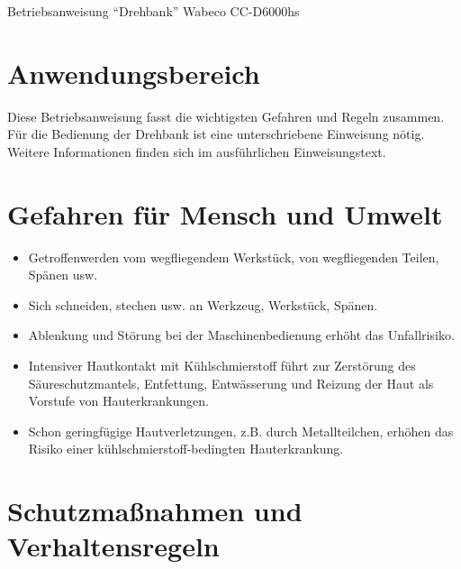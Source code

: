 \documentclass[fontsize=9pt]{scrartcl}
\newenvironment{smallitemize}{\begin{itemize}\itemsep -3pt}{\end{itemize}}
\begin{document}

\begin{center}
	\LARGE{Betriebsanweisung \enquote{Drehbank} Wabeco CC-D6000hs}
\end{center}


\section{Anwendungsbereich}
\begin{center}
	Diese Betriebsanweisung fasst die wichtigsten Gefahren und Regeln zusammen.\\
	Für die Bedienung der Drehbank ist eine unterschriebene Einweisung nötig.\\
	Weitere Informationen finden sich im ausführlichen Einweisungstext.\\
\end{center}

\section{Gefahren für Mensch und Umwelt}

\begin{smallitemize}
	\item Getroffenwerden vom wegfliegendem Werkstück, von wegfliegenden Teilen, Spänen usw.
	\item Sich schneiden, stechen usw. an Werkzeug, Werkstück, Spänen.
	\item Ablenkung und Störung bei der Maschinenbedienung erhöht das Unfallrisiko.
	\item Intensiver Hautkontakt mit Kühlschmierstoff führt zur Zerstörung des Säureschutzmantels, Entfettung, Entwässerung und Reizung der Haut als Vorstufe von Hauterkrankungen.
	\item Schon geringfügige Hautverletzungen, z.B. durch Metallteilchen, erhöhen das Risiko einer kühlschmierstoff-bedingten Hauterkrankung.
\end{smallitemize}

\section{Schutzmaßnahmen und Verhaltensregeln}
\end{document}
